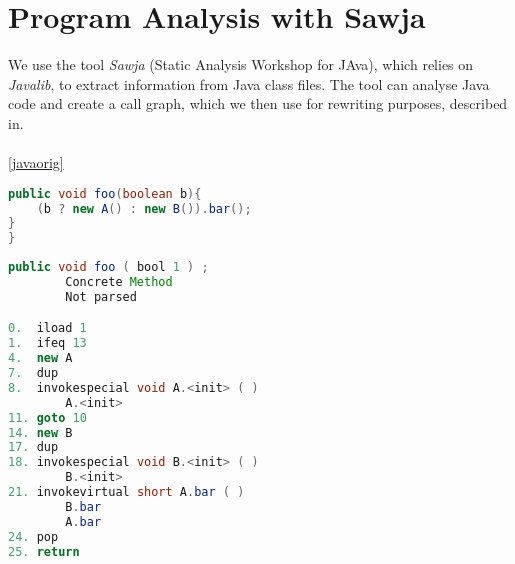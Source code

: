 \section{Program Analysis with Sawja}
We use the tool \textit{Sawja} (Static Analysis Workshop for JAva)\cite{sawja}, which relies on \textit{Javalib}, to extract information from Java class files. The tool can analyse Java code and create a call graph, which we then use for rewriting purposes, described in.\\\\

\cref{javaorig}





\begin{lstlisting}[caption=Java sample.,language=Java,label=lst:javaorig]
public void foo(boolean b){
    (b ? new A() : new B()).bar();
}
}
\end{lstlisting}

\begin{lstlisting}[caption=Sawja sample.,language=Java,label=lst:javasawja]
public void foo ( bool 1 ) ;
		Concrete Method
    	Not parsed

0.  iload 1
1.  ifeq 13
4.  new A
7.  dup
8.  invokespecial void A.<init> ( )
        A.<init>
11. goto 10
14. new B
17. dup
18. invokespecial void B.<init> ( )
        B.<init>
21. invokevirtual short A.bar ( )
        B.bar
        A.bar
24. pop
25. return

\end{lstlisting}